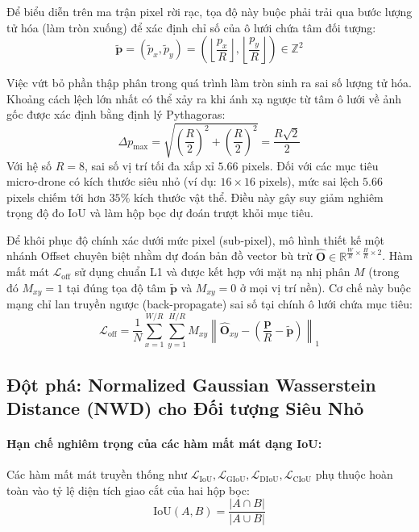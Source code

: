 \documentclass[11pt,a4paper]{article}
\begin{document}
Để biểu diễn trên ma trận pixel rời rạc, tọa độ này buộc phải trải qua bước lượng tử hóa (làm tròn xuống) để xác định chỉ số của ô lưới chứa tâm đối tượng:
\begin{equation}
    \tilde{\mathbf{p}} = (\tilde{p}_x, \tilde{p}_y) = \left( \left\lfloor \frac{p_x}{R} \right\rfloor, \left\lfloor \frac{p_y}{R} \right\rfloor \right) \in \mathbb{Z}^2
\end{equation}

Việc vứt bỏ phần thập phân trong quá trình làm tròn sinh ra sai số lượng tử hóa. Khoảng cách lệch lớn nhất có thể xảy ra khi ánh xạ ngược từ tâm ô lưới về ảnh gốc được xác định bằng định lý Pythagoras:
\begin{equation}
    \Delta p_{\max} = \sqrt{\left(\frac{R}{2}\right)^2 + \left(\frac{R}{2}\right)^2} = \frac{R\sqrt{2}}{2}
\end{equation}
Với hệ số $R = 8$, sai số vị trí tối đa xấp xỉ $5.66$ pixels. Đối với các mục tiêu micro-drone có kích thước siêu nhỏ (ví dụ: $16 \times 16$ pixels), mức sai lệch $5.66$ pixels chiếm tới hơn $35\%$ kích thước vật thể. Điều này gây suy giảm nghiêm trọng độ đo IoU và làm hộp bọc dự đoán trượt khỏi mục tiêu.

Để khôi phục độ chính xác dưới mức pixel (sub-pixel), mô hình thiết kế một nhánh Offset chuyên biệt nhằm dự đoán bản đồ vector bù trừ $\hat{\mathbf{O}} \in \mathbb{R}^{\frac{W}{R} \times \frac{H}{R} \times 2}$. Hàm mất mát $\mathcal{L}_{\text{off}}$ sử dụng chuẩn L1 và được kết hợp với mặt nạ nhị phân $M$ (trong đó $M_{xy} = 1$ tại đúng tọa độ tâm $\tilde{\mathbf{p}}$ và $M_{xy} = 0$ ở mọi vị trí nền). Cơ chế này buộc mạng chỉ lan truyền ngược (back-propagate) sai số tại chính ô lưới chứa mục tiêu:
\begin{equation}
    \mathcal{L}_{\text{off}} = \frac{1}{N} \sum_{x=1}^{W/R} \sum_{y=1}^{H/R} M_{xy} \left\| \hat{\mathbf{O}}_{xy} - \left( \frac{\mathbf{p}}{R} - \tilde{\mathbf{p}} \right) \right\|_1
\end{equation}

\subsection{Đột phá: Normalized Gaussian Wasserstein Distance (NWD) cho Đối tượng Siêu Nhỏ}
\label{sec:nwd_loss}

\paragraph{Hạn chế nghiêm trọng của các hàm mất mát dạng IoU:}
Các hàm mất mát truyền thống như $\mathcal{L}_{\text{IoU}}, \mathcal{L}_{\text{GIoU}}, \mathcal{L}_{\text{DIoU}}, \mathcal{L}_{\text{CIoU}}$ phụ thuộc hoàn toàn vào tỷ lệ diện tích giao cắt của hai hộp bọc:
\begin{equation}
    \text{IoU}(A, B) = \frac{|A \cap B|}{|A \cup B|}
\end{equation}
\end{document}
